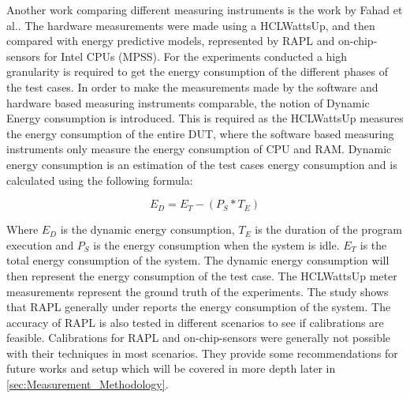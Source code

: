 Another work comparing different measuring instruments is the work by Fahad et al.\cite{fahad2019comparative}. The hardware measurements were made using a HCLWattsUp, and then compared with energy predictive models, represented by RAPL and on-chip-sensors for Intel CPUs (MPSS). For the experiments conducted a high granularity is required to get the energy consumption of the different phases of the test cases. In order to make the measurements made by the software and hardware based measuring instruments comparable, the notion of Dynamic Energy consumption is introduced. This is required as the HCLWattsUp measures the energy consumption of the entire DUT, where the software based measuring instruments only measure the energy consumption of CPU and RAM. Dynamic energy consumption is an estimation of the test cases energy consumption and is calculated using the following formula:\cite{fahad2019comparative}

\begin{equation}\label{eq:dynamicEnergy}
    E_D = E_T - (P_S * T_E)
\end{equation}

Where $E_D$ is the dynamic energy consumption, $T_E$ is the duration of the program execution and $P_S$ is the energy consumption when the system is idle. $E_T$ is the total energy consumption of the system. The dynamic energy consumption will then represent the energy consumption of the test case. The HCLWattsUp meter measurements represent the ground truth of the experiments. The study shows that RAPL generally under reports the energy consumption of the system. The accuracy of RAPL is also tested in different scenarios to see if calibrations are feasible. Calibrations for RAPL and on-chip-sensors were generally not possible with their techniques in most scenarios. They provide some recommendations for future works and setup which will be covered in more depth later in \cref{sec:Measurement_Methodology}.